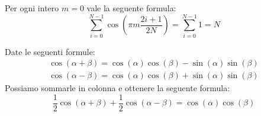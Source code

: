 \begin{proposizione}
    Per ogni intero $m = 0$ vale la seguente formula:
    \begin{equation}
        \sum_{i=0}^{N-1} \cos\left(\pi m \frac{2i+1}{2N}\right) = \sum_{i=0}^{N-1} 1 = N
    \end{equation}
\end{proposizione}
\begin{nota}
    Date le seguenti formule:
    \begin{equation*}
        \begin{array}{l}
            \cos (\alpha + \beta) = \cos(\alpha) \cos (\beta) - \sin(\alpha)\sin(\beta) \\
            \cos (\alpha - \beta) = \cos(\alpha) \cos (\beta) + \sin(\alpha)\sin(\beta)
        \end{array}
    \end{equation*}
    Possiamo sommarle in colonna e ottenere la seguente formula:
    \begin{equation}\label{eq:cos_sum}
        \frac{1}{2}\cos (\alpha + \beta)  + \frac{1}{2}\cos(\alpha-\beta) = \cos(\alpha) \cos(\beta)
    \end{equation}
\end{nota}
